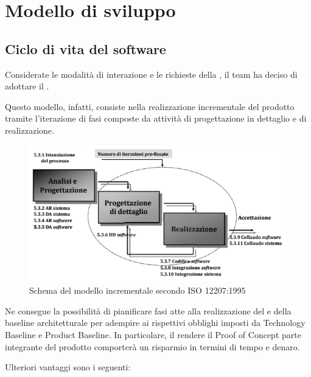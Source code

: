 \section{Modello di sviluppo} \label{modello di sviluppo}

    \subsection{Ciclo di vita del software}

        Considerate le modalità di interazione e le richieste della , il team ha deciso di adottare il
        .

        Questo modello, infatti, consiste nella realizzazione incrementale del prodotto tramite l'iterazione di fasi
        composte da attività di progettazione in dettaglio e di realizzazione.

        \begin{figure}[htbp]
            \centering
            \includegraphics[scale=0.75]{./img/ModelloIncrementale.png}
            \caption[Immagine del modello di sviluppo incrementale]{Schema del modello incrementale secondo ISO 12207:1995}
        \end{figure}

        Ne consegue la possibilità di pianificare fasi atte alla realizzazione del  e
        della baseline architetturale per adempire ai rispettivi obblighi imposti da Technology Baseline e Product Baseline.
        In particolare, il rendere il Proof of Concept parte integrante del prodotto comporterà un risparmio in termini
        di tempo e denaro.

        Ulteriori vantaggi sono i seguenti:

